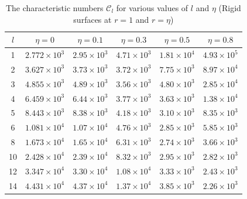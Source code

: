 \begin{table}[ht]
\centering
\caption{The characteristic numbers $\mathcal{C}_l$ for various values of $l$ and $\eta$\newline
(Rigid surfaces at $r = 1$ and $r = \eta$)}
\label{tab:XXV}
\begin{tabular}{c c c c c c}
\hline
$l$ & $\eta = 0$ & $\eta = 0.1$ & $\eta = 0.3$ & $\eta = 0.5$ & $\eta = 0.8$ \\
\hline
1 & $2.772\times 10^3$ & $2.95\times 10^3$ & $4.71\times 10^3$ & $1.81\times 10^4$ & $4.93\times 10^5$ \\
2 & $3.627\times 10^3$ & $3.73\times 10^3$ & $3.72\times 10^3$ & $7.75\times 10^3$ & $8.97\times 10^4$ \\
3 & $4.855\times 10^3$ & $4.89\times 10^3$ & $3.56\times 10^3$ & $4.80\times 10^3$ & $2.85\times 10^4$ \\
4 & $6.459\times 10^3$ & $6.44\times 10^3$ & $3.77\times 10^3$ & $3.63\times 10^3$ & $1.38\times 10^4$ \\
5 & $8.443\times 10^3$ & $8.38\times 10^3$ & $4.18\times 10^3$ & $3.10\times 10^3$ & $8.35\times 10^3$ \\
6 & $1.081\times 10^4$ & $1.07\times 10^4$ & $4.76\times 10^3$ & $2.85\times 10^3$ & $5.85\times 10^3$ \\
8 & $1.673\times 10^4$ & $1.65\times 10^4$ & $6.31\times 10^3$ & $2.74\times 10^3$ & $3.66\times 10^3$ \\
10 & $2.428\times 10^4$ & $2.39\times 10^4$ & $8.32\times 10^3$ & $2.95\times 10^3$ & $2.82\times 10^3$ \\
12 & $3.347\times 10^4$ & $3.30\times 10^4$ & $1.08\times 10^4$ & $3.33\times 10^3$ & $2.43\times 10^3$ \\
14 & $4.431\times 10^4$ & $4.37\times 10^4$ & $1.37\times 10^4$ & $3.85\times 10^3$ & $2.26\times 10^3$ \\
\hline
\end{tabular}
\end{table}

